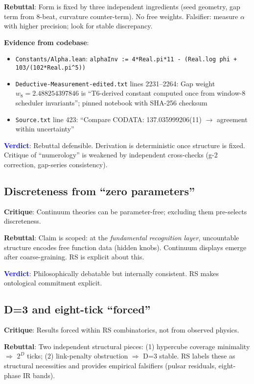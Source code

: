 \documentclass[11pt]{article}
\begin{document}
\textbf{Rebuttal}: Form is fixed by three independent ingredients (seed geometry, gap term from 8-beat, curvature counter-term). No free weights. Falsifier: measure $\alpha$ with higher precision; look for stable discrepancy.

\noindent\textbf{Evidence from codebase}:
\begin{itemize}
\item \texttt{Constants/Alpha.lean}: \texttt{alphaInv := 4*Real.pi*11 - (Real.log phi + 103/(102*Real.pi\^{}5))}
\item \texttt{Deductive-Measurement-edited.txt} lines 2231--2264: Gap weight $w_8=2.488254397846$ is ``T6-derived constant computed once from window-8 scheduler invariants''; pinned notebook with SHA-256 checksum
\item \texttt{Source.txt} line 423: ``Compare CODATA: 137.035999206(11) $\to$ agreement within uncertainty''
\end{itemize}

\noindent\textcolor{blue}{\textbf{Verdict}}: Rebuttal defensible. Derivation is deterministic once structure is fixed. Critique of ``numerology'' is weakened by independent cross-checks (g-2 correction, gap-series consistency).

\subsection{Discreteness from ``zero parameters''}

\textbf{Critique}: Continuum theories can be parameter-free; excluding them pre-selects discreteness.

\textbf{Rebuttal}: Claim is scoped: at the \emph{fundamental recognition layer}, uncountable structure encodes free function data (hidden knobs). Continuum displays emerge after coarse-graining. RS is explicit about this.

\noindent\textcolor{blue}{\textbf{Verdict}}: Philosophically debatable but internally consistent. RS makes ontological commitment explicit.

\subsection{D=3 and eight-tick ``forced''}

\textbf{Critique}: Results forced within RS combinatorics, not from observed physics.

\textbf{Rebuttal}: Two independent structural pieces: (1) hypercube coverage minimality $\Rightarrow$ $2^D$ ticks; (2) link-penalty obstruction $\Rightarrow$ D=3 stable. RS labels these as structural necessities and provides empirical falsifiers (pulsar residuals, eight-phase IR bands).
\end{document}
